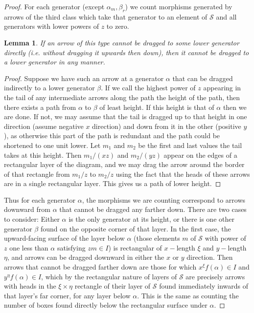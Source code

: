 \documentclass[a4page]{article}
\newtheorem{lemma}{Lemma}[section]
\theoremstyle{definition}
\def\S{\mathcal{S}}
\begin{document}
\begin{proof}
For each generator (except $\alpha_m, \beta_r$) we count morphisms generated by arrows of the third class which take that generator to an element of $\S$ and all generators with lower powers of $z$ to zero.
\begin{lemma} If an arrow of this type cannot be dragged to some lower generator directly (i.e.
without dragging it upwards then down), then it cannot be dragged to a lower generator in any manner.
\end{lemma}
\begin{proof}
Suppose we have such an arrow at a generator $\alpha$ that can be dragged indirectly to a lower generator $\beta$.
If we call the highest power of $z$ appearing in the tail of any intermediate arrows along the path the height of the path,
then there exists a path from $\alpha$ to $\beta$ of least height.
If this height is that of $\alpha$ then we are done.
If not, we may assume that the tail is dragged up to that height in one direction (assume negative $x$ direction) and down from it in the other (positive $y$),
as otherwise this part of the path is redundant and the path could be shortened to one unit lower.
Let $m_1$ and $m_2$ be the first and last values the tail takes
at this height.
Then $m_1/(xz)$ and $m_2/(yz)$ appear on the edges of a rectangular layer of the diagram,
and we may drag the arrow around the border of that rectangle from $m_1/z$ to $m_2/z$ using the fact that the heads of these arrows are in a single rectangular layer.
This gives us a path of lower height.
\end{proof}


Thus for each generator $\alpha$, the morphisms we are counting correspond to arrows downward from $\alpha$ that cannot be dragged any farther down.
There are two cases to consider: Either $\alpha$ is the only generator at its height, or there is one other generator $\beta$ found on the opposite corner of that layer.
In the first case, the upward-facing surface of the layer below $\alpha$ (those elements $m$ of $\S$ with power of $z$ one less than $\alpha$ satisfying $zm \in I$)
is rectangular of $x-$length $\xi$ and $y-$length $\eta$, and arrows can be dragged downward in either the $x$ or $y$ direction.
Then arrows that cannot be dragged farther down are those for which $x^{\xi}f(\alpha) \in I$ and $y^\eta f(\alpha) \in I$,
which by the rectangular nature of layers of $\S$ are precisely arrows with heads in the $\xi \times \eta$ rectangle of their layer of $\S$
found immediately inwards of that layer's far corner, for any layer below $\alpha$.
This is the same as counting the number of boxes found
directly below the rectangular surface under $\alpha$.


\end{proof}
\end{document}
